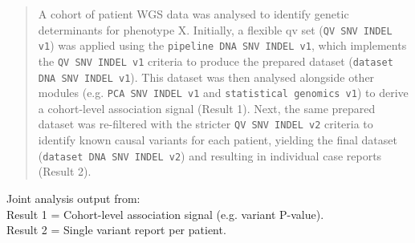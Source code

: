\begin{quotation}
A cohort of patient WGS data was analysed to identify genetic determinants for phenotype X. Initially, a flexible \ac{qv} set (\texttt{QV SNV INDEL v1}) was applied using the 
\colorbox{colorSUNSET1!30}{\texttt{pipeline DNA SNV INDEL v1}}, which implements the \texttt{QV SNV INDEL v1} criteria to produce the prepared dataset (\colorbox{colorSUNSET3!30}{\texttt{dataset DNA SNV INDEL v1}}). This dataset was then analysed alongside other modules (e.g. \colorbox{colorSUNSET4!30}{\texttt{PCA SNV INDEL v1}} and \colorbox{colorSUNSET5!30}{\texttt{statistical genomics v1}}) to derive a cohort-level association signal (Result 1). Next, the same prepared dataset was re-filtered with the stricter \texttt{QV SNV INDEL v2} criteria to identify known causal variants for each patient, yielding the final dataset (\colorbox{colorSUNSET3!30}{\texttt{dataset DNA SNV INDEL v2}}) and resulting in individual case reports (Result 2).
\end{quotation}

\begin{tcolorbox}[
    colback=white!0,
    colframe=black,
    boxrule=1pt,
    arc=1mm,
    outer arc=1mm,
    title=\textbf{\refstepcounter{myboxcounter}\label{box:pipe}Box \themyboxcounter: Example diagrammatic representation}
]
\medskip

Joint analysis output from:\\
Result 1 = Cohort-level association signal (e.g. variant P-value).\\
Result 2 = Single variant report per patient.
\end{tcolorbox}


